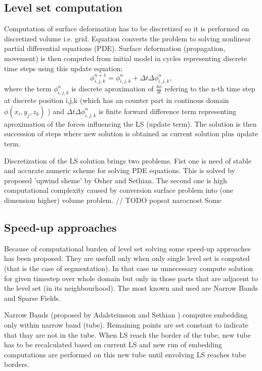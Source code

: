 \subsection{Level set computation}

Computation of surface deformation has to be discretized so it is performed on discretized volume i.e. grid. Equation converts the problem to solving nonlinear partial differential equations (PDE). Surface deformation (propagation, movement) is then computed from initial model in cycles representing discrete time steps using this update equation:
\begin{equation}
\label{deformEqApprox}
\phi_{i,j,k}^{n+1} = \phi_{i,j,k}^{n} + \Delta t \Delta \phi_{i,j,k}^{n},
\end{equation}
where the term $\phi_{i,j,k}^{n}$ is discrete aproximation of $\frac{\delta\phi}{\delta t}$ refering to the n-th time step at discrete position i,j,k (which has an counter part in continous domain $\phi(x_i, y_j, z_k)$ ) and $\Delta t \Delta \phi_{i,j,k}^{n}$ is finite forward difference term representing aproximation of the forces influencing the LS (update term). The solution is then succession of steps where new solution is obtained as current solution plus update term.

Discretization of the LS solution brings two problems. Fist one is need of stable and accurate numeric scheme for solving PDE equations. This is solved by proposed 'upwind sheme' by Osher and Sethian. The second one is high computational complexity caused by conversion surface problem into (one dimension higher) volume problem. 
// TODO popsat narocnost
Some 

\subsection{Speed-up approaches}

Because of computational burden of level set solving some speed-up approaches has been proposed. They are usefull only when only single level set is conputed (that is the case of segmentation). In that case us unnecessary compute solution for given timestep over whole domain but only in those parts that are adjacent to the level set (in its neighbourhood). The most known and used are Narrow Bands and Sparse Fields. 

Narrow Bands (proposed by Adalsteinsson and Sethian \cite{sethianFastLS}) computes embedding only within narrow band (tube). Remaining points are set constant to indicate that thay are not in the tube. When LS reach the border of the tube, new tube has to be recalculated based on current LS and new run of embedding computations are performed on this new tube until envolving LS reaches tube borders.

